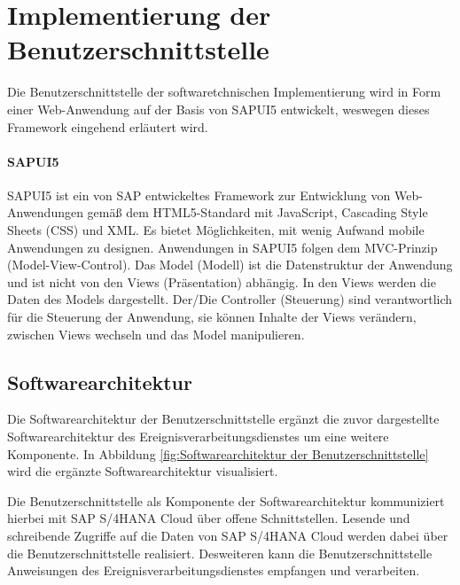 \section{Implementierung der Benutzerschnittstelle}\label{sec:frontend}
Die Benutzerschnittstelle der softwaretchnischen Implementierung wird in Form einer Web-Anwendung auf der Basis von SAPUI5 entwickelt, weswegen dieses Framework eingehend erläutert wird.

\paragraph{SAPUI5} SAPUI5 ist ein von SAP entwickeltes Framework zur Entwicklung von Web-Anwendungen gemäß dem HTML5-Standard mit JavaScript, Cascading Style Sheets (CSS) und XML. Es bietet Möglichkeiten, mit wenig Aufwand mobile Anwendungen zu designen.
Anwendungen in SAPUI5 folgen dem MVC-Prinzip (Model-View-Control). Das Model (Modell) ist die Datenstruktur der Anwendung und ist nicht von den Views (Präsentation) abhängig. In den Views werden die Daten des Models dargestellt. Der/Die Controller (Steuerung) sind verantwortlich für die Steuerung der Anwendung, sie können Inhalte der Views verändern, zwischen Views wechseln und das Model manipulieren.
\cite{Goebels.2017}

\subsection{Softwarearchitektur}
Die Softwarearchitektur der Benutzerschnittstelle ergänzt die zuvor dargestellte Softwarearchitektur des Ereignisverarbeitungsdienstes um eine weitere Komponente. In Abbildung \ref{fig:Softwarearchitektur der Benutzerschnittstelle} wird die ergänzte Softwarearchitektur visualisiert.

Die Benutzerschnittstelle als Komponente der Softwarearchitektur kommuniziert hierbei mit SAP S/4HANA Cloud über offene Schnittstellen. Lesende und schreibende Zugriffe auf die Daten von SAP S/4HANA Cloud werden dabei über die Benutzerschnittstelle realisiert. Desweiteren kann die Benutzerschnittstelle Anweisungen des Ereignisverarbeitungsdienstes empfangen und verarbeiten.

